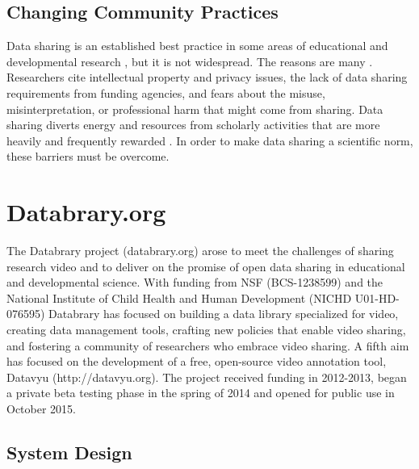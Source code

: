 \documentclass[letterpaper,man,apacite]{apa6}
\begin{document}
\subsection{Changing Community Practices}
Data sharing is an established best practice in some areas of educational and developmental research \cite{AERA-Code-2011}, but it is not widespread.
The reasons are many \cite{Ascoli2006b,Ferguson2014}.
Researchers cite intellectual property and privacy issues, the lack of data sharing requirements from funding agencies, and fears about the misuse, misinterpretation, or professional harm that might come from sharing.
Data sharing diverts energy and resources from scholarly activities that are more heavily and frequently rewarded \cite{Ascoli2006b,Ferguson2014}.
In order to make data sharing a scientific norm, these barriers must be overcome.

\section{Databrary.org}
The Databrary project (databrary.org) arose to meet the challenges of sharing research video and to deliver on the promise of open data sharing in educational and developmental science.
With funding from NSF (BCS-1238599) and the National Institute of Child Health and Human Development (NICHD U01-HD-076595) Databrary has focused on building a data library specialized for video, creating data management tools, crafting new policies that enable video sharing, and fostering a community of researchers who embrace video sharing.
A fifth aim has focused on the development of a free, open-source video annotation tool, Datavyu (http://datavyu.org).
The project received funding in 2012-2013, began a private beta testing phase in the spring of 2014 and opened for public use in October 2015.

\subsection{System Design}
\end{document}
